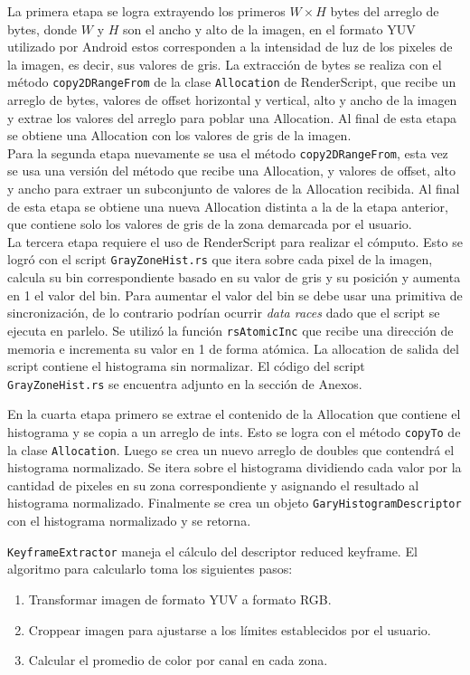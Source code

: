 La primera etapa se logra extrayendo los primeros $W\times H$ bytes del arreglo de bytes, donde $W$ y $H$ son el ancho y alto de la imagen, en el formato YUV utilizado por Android estos corresponden a la intensidad de luz de los pixeles de la imagen, es decir, sus valores de gris. La extracción de bytes se realiza con el método \texttt{copy2DRangeFrom} de la clase \texttt{Allocation} de RenderScript, que recibe un arreglo de bytes, valores de offset horizontal y vertical, alto y ancho de la imagen y extrae los valores del arreglo para poblar una Allocation. Al final de esta etapa se obtiene una Allocation con los valores de gris de la imagen. \\

Para la segunda etapa nuevamente se usa el método \texttt{copy2DRangeFrom}, esta vez se usa una versión del método que recibe una Allocation, y valores de offset, alto y ancho para extraer un subconjunto de valores de la Allocation recibida. Al final de esta etapa se obtiene una nueva Allocation distinta a la de la etapa anterior, que contiene solo los valores de gris de la zona demarcada por el usuario.\\

La tercera etapa requiere el uso de RenderScript para realizar el cómputo. Esto se logró con el script \texttt{GrayZoneHist.rs} que itera sobre cada pixel de la imagen, calcula su bin correspondiente basado en su valor de gris y su posición y aumenta en 1 el valor del bin. Para aumentar el valor del bin se debe usar una primitiva de sincronización, de lo contrario podrían ocurrir \emph{data races} dado que el script se ejecuta en parlelo. Se utilizó la función \texttt{rsAtomicInc} que recibe una dirección de memoria e incrementa su valor en 1 de forma atómica. La allocation de salida del script contiene el histograma sin normalizar. El código del script \texttt{GrayZoneHist.rs} se encuentra adjunto en la sección de Anexos.

En la cuarta etapa primero se extrae el contenido de la Allocation que contiene el histograma y se copia a un arreglo de ints. Esto se logra con el método \texttt{copyTo} de la clase \texttt{Allocation}. Luego se crea un nuevo arreglo de doubles que contendrá el histograma normalizado. Se itera sobre el histograma dividiendo cada valor por la cantidad de pixeles en su zona correspondiente y asignando el resultado al histograma normalizado. Finalmente se crea un objeto \texttt{GaryHistogramDescriptor} con el histograma normalizado y se retorna.

\texttt{KeyframeExtractor} maneja el cálculo del descriptor reduced keyframe. El algoritmo para calcularlo toma los siguientes pasos:
\begin{enumerate}
\item Transformar imagen de formato YUV a formato RGB.
\item Croppear imagen para ajustarse a los límites establecidos por el usuario.
\item Calcular el promedio de color por canal en cada zona.
\end{enumerate}


